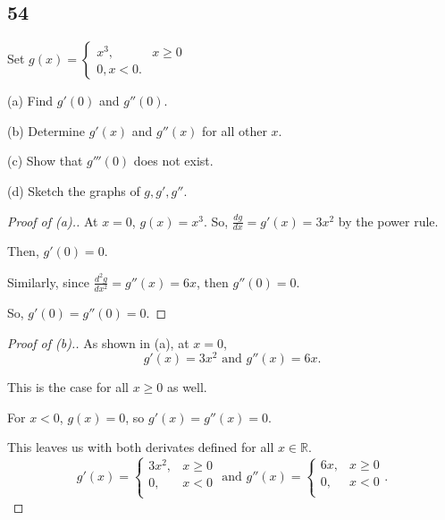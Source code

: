 \documentclass[../hw3.tex]{subfiles}
\begin{document}
\subsection*{54}
Set $g(x) = \begin{cases}
    x^3, & x \geq 0 \\
    0, x < 0.
\end{cases}$

(a) Find $g'(0)$ and $g''(0)$.

(b) Determine $g'(x)$ and $g''(x)$ for all other $x$.

(c) Show that $g'''(0)$ does not exist.

(d) Sketch the graphs of $g,g',g''$.

\begin{proof}[Proof of (a).]
    At $x=0$, $g(x) = x^3$. So, $\frac{dg}{dx} = g'(x) = 3x^2$ by the power rule.

    Then, $g'(0) = 0$.

    Similarly, since $\frac{d^{2}g}{dx^2} = g''(x) = 6x$, then $g''(0) = 0$.

    So, $g'(0) = g''(0) = 0$.
\end{proof}

\begin{proof}[Proof of (b).]
    As shown in (a), at $x=0$,
    \[g'(x) = 3x^2 \text{ and } g''(x) = 6x.\]
    
    This is the case for all $x \geq 0$ as well.

    For $x < 0$, $g(x) = 0$, so $g'(x) = g''(x) = 0$.

    This leaves us with both derivates defined for all $x \in \mathbb{R}$.
    \[g'(x) = \begin{cases}
        3x^2, & x \geq 0 \\
        0, & x < 0 \\
    \end{cases} \text{ and } g''(x) = \begin{cases}
        6x, & x \geq 0 \\
        0, & x < 0 \\
    \end{cases}.\]
\end{proof}
\end{document}
